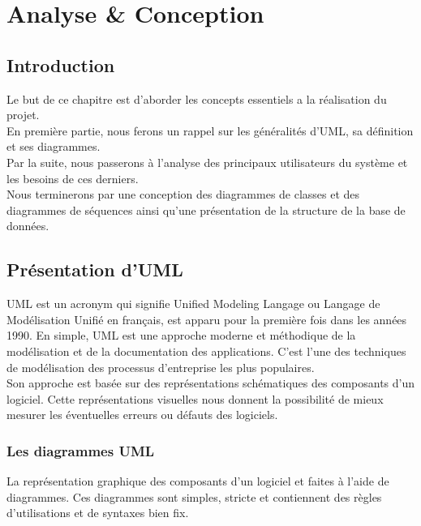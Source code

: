 \chapter{Analyse \& Conception}

\section{Introduction}
Le but de ce chapitre est d'aborder les concepts essentiels a la réalisation du projet.\\

En première partie, nous ferons un rappel sur les généralités d'UML, sa définition et ses diagrammes.\\

Par la suite, nous passerons à l'analyse des principaux utilisateurs du système et les besoins de ces derniers.\\

Nous terminerons par une conception des diagrammes de classes et des diagrammes de séquences ainsi qu'une présentation de la structure de la base de données.\\

\section{Présentation d'\acs{UML}}
\acs{UML}\cite{uml-diag} est un acronym qui signifie Unified Modeling Langage ou Langage de Modélisation Unifié en français, est apparu pour la première fois dans les années 1990. En simple, \acs{UML} est une approche moderne et méthodique de la modélisation et de la documentation des applications. C'est l'une des techniques de modélisation des processus d'entreprise les plus populaires.\\

Son approche est basée sur des représentations schématiques des composants d'un logiciel. Cette représentations visuelles nous donnent la possibilité de mieux mesurer les éventuelles erreurs ou défauts des logiciels.\\

\subsection{Les diagrammes \acs{UML}}
La représentation graphique des composants d'un logiciel\cite{uml-diag} et faites à l'aide de diagrammes. Ces diagrammes sont simples, stricte et contiennent des règles d'utilisations et de syntaxes bien fix.\\

